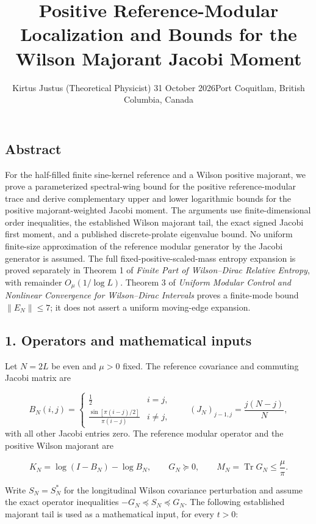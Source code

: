 \documentclass[
  10pt,
  a4paper,
]{article}
\title{Positive Reference-Modular Localization and Bounds for the Wilson Majorant Jacobi Moment}
\author{Kirtus Justus (Theoretical Physicist) \textbullet{} 31 October 2026\tabularnewline Port Coquitlam, British Columbia, Canada}
\date{}
\begin{document}
\maketitle

\subsection{Abstract}\label{abstract}

For the half-filled finite sine-kernel reference and a Wilson positive majorant, we prove a parameterized spectral-wing bound for the positive reference-modular trace and derive complementary upper and lower logarithmic bounds for the positive majorant-weighted Jacobi moment. The arguments use finite-dimensional order inequalities, the established Wilson majorant tail, the exact signed Jacobi first moment, and a published discrete-prolate eigenvalue bound. No uniform finite-size approximation of the reference modular generator by the Jacobi generator is assumed. The full fixed-positive-scaled-mass entropy expansion is proved separately in Theorem 1 of \emph{Finite Part of Wilson--Dirac Relative Entropy}, with remainder \(O_\mu(1/\log L)\). Theorem 3 of \emph{Uniform Modular Control and Nonlinear Convergence for Wilson--Dirac Intervals} proves a finite-mode bound \(\|E_N\|\le7\); it does not assert a uniform moving-edge expansion.

\subsection{1. Operators and mathematical inputs}\label{operators-and-mathematical-inputs}

Let \(N=2L\) be even and \(\mu>0\) fixed. The reference covariance and commuting Jacobi matrix are

\[
B_N(i,j)=\begin{cases}\frac12&i=j,\\\frac{\sin[\pi(i-j)/2]}{\pi(i-j)}&i\ne j,\end{cases}
\qquad (J_N)_{j-1,j}=\frac{j(N-j)}N,
\] with all other Jacobi entries zero. The reference modular operator and the positive Wilson majorant are

\[
K_N=\log(I-B_N)-\log B_N,\qquad G_N\succeq0,\qquad M_N=\operatorname{Tr}G_N\le\frac\mu\pi.
\]

Write \(S_N=S_N^*\) for the longitudinal Wilson covariance perturbation and assume the exact operator inequalities \(-G_N\preceq S_N\preceq G_N\). The following established majorant tail is used as a mathematical input, for every \(t>0\):
\end{document}

